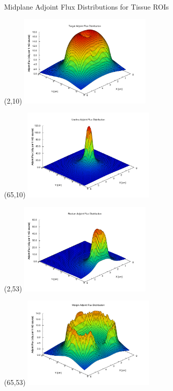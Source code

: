 \documentclass{beamer}
\begin{document}
\begin{frame}{Midplane Adjoint Flux Distributions for Tissue ROIs}

  \begin{textblock}{20}(2,10)
    \includegraphics[width=2.5in]{figures/Target_adjoint_flux-midplane.pdf}
  \end{textblock}

  \begin{textblock}{20}(65,10)
    \includegraphics[width=2.5in]{figures/Urethra_adjoint_flux-midplane.pdf}
  \end{textblock}

  \begin{textblock}{20}(2,53)
    \includegraphics[width=2.5in]{figures/Rectum_adjoint_flux-midplane.pdf}
  \end{textblock}

  \begin{textblock}{20}(65,53)
    \includegraphics[width=2.5in]{figures/Margin_adjoint_flux-midplane.pdf}
  \end{textblock}

\end{frame}
\end{document}
